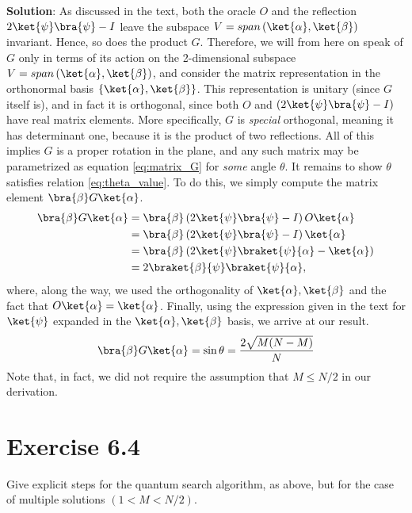 \documentclass{book}
\begin{document}
    \textbf{Solution}: As discussed in the text, both the oracle $O$ and the reflection $2\ket{\psi}\bra{\psi}-I$ leave the subspace $V = span\left(\ket{\alpha},\ket{\beta}\right)$ invariant. Hence, so does the product $G$. Therefore, we will from here on speak of $G$ only in terms of its action on the 2-dimensional subspace $V = span\left(\ket{\alpha},\ket{\beta}\right)$, and consider the matrix representation in the orthonormal basis $\{\ket{\alpha},\ket{\beta}\}$. This representation is unitary (since $G$ itself is), and in fact it is orthogonal, since both $O$ and $(2\ket{\psi}\bra{\psi}-I)$ have real matrix elements. More specifically, $G$ is \emph{special} orthogonal, meaning it has determinant one, because it is the product of two reflections. All of this implies $G$ is a proper rotation in the plane, and any such matrix may be parametrized as equation \eqref{eq:matrix_G} for \emph{some} angle $\theta$. It remains to show $\theta$ satisfies relation \eqref{eq:theta_value}. To do this, we simply compute the matrix element $\bra{\beta}G\ket{\alpha}$.
    \begin{align}
    \begin{aligned}
        \bra{\beta}G\ket{\alpha} &= \bra{\beta}\left(2\ket{\psi}\bra{\psi}-I\right)O\ket{\alpha} \\
        &=\bra{\beta}\left(2\ket{\psi}\bra{\psi}-I\right)\ket{\alpha}\\
        &=\bra{\beta}\left(2\ket{\psi}\braket{\psi}{\alpha}-\ket{\alpha}\right) \\
        &=2\braket{\beta}{\psi}\braket{\psi}{\alpha},
    \end{aligned}
    \end{align}
    where, along the way, we used the orthogonality of $\ket{\alpha},\ket{\beta}$ and the fact that $O\ket{\alpha} = \ket{\alpha}$. Finally, using the expression given in the text for $\ket{\psi}$ expanded in the $\ket{\alpha},\ket{\beta}$ basis, we arrive at our result. 
    \begin{align}
        \bra{\beta}G\ket{\alpha} = \sin\theta = \frac{2\sqrt{M(N-M)}}{N}
    \end{align}
    Note that, in fact, we did not require the assumption that $M\leq N/2$ in our derivation.

\section*{Exercise 6.4}
    Give explicit steps for the quantum search algorithm, as above, but for the case of multiple solutions $(1<M<N/2)$.
    
\end{document}
